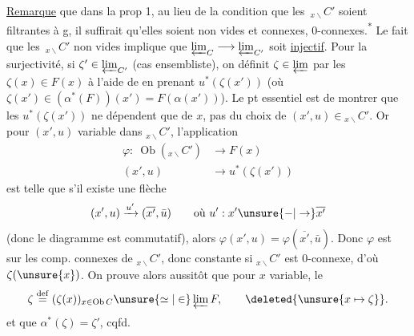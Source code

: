 \uline{Remarque}  que dans la prop 1, au lieu de la condition  que les $\,{}_{x\backslash}C'$ soient  filtrantes à g, il suffirait qu'elles soient non vides et  connexes, $0$-connexes.\textsuperscript{*}
Le fait que les $\,{}_{x\backslash}C'$ non vides implique que $\varprojlim_C\longrightarrow\varprojlim_{C'}$ soit \uline{injectif}. Pour la surjectivité, si $\zeta'\in\varprojlim_{C'}$ (cas ensembliste), on définit $\zeta\in\varprojlim$ par les $\zeta(x)\in F(x)$ à l'aide de
 en prenant $u^*(\zeta(x'))$ (où $\zeta(x')\in(\alpha^*(F))(x')=F(\alpha(x'))$). Le pt essentiel est de montrer que  les $u^*(\zeta(x'))$  ne dépendent que de $x$, pas du choix de $(x',u)\in {}_{x\backslash}C'$. Or pour $(x',u)$ variable dans $ {}_{x\backslash}C'$, l'application
\[
\begin{aligned}
\varphi:\ \operatorname{Ob}({}_{x\backslash}C')&\longrightarrow F(x)\\
(x',u)&\longrightarrow u^*(\zeta(x'))
\end{aligned}
\]
est telle que s'il existe une flèche
\[
(x',u)\xrightarrow{u'}(\overline{x'},\bar u)
\qquad\text{où }u':x'\unsure{-|\to}\overline{x'}
\]
 (donc le diagramme
est commutatif), alors $\varphi(x',u)=\varphi(\overline{x'},\bar u)$. Donc $\varphi$ est  sur les comp. connexes de $ {}_{x\backslash}C'$, donc constante si $ {}_{x\backslash}C'$ est 0-connexe, d'où $\zeta(\unsure{x})$. On prouve alors aussitôt que pour $x$ variable, le
\[
\zeta\overset{\mathrm{def}}{=}(\zeta(x))_{x\in\operatorname{Ob}C}\unsure{\simeq|\in}\varprojlim F,\qquad\deleted{\unsure{x\mapsto\zeta}}.
\]
et que $\alpha^*(\zeta)=\zeta'$, cqfd.

